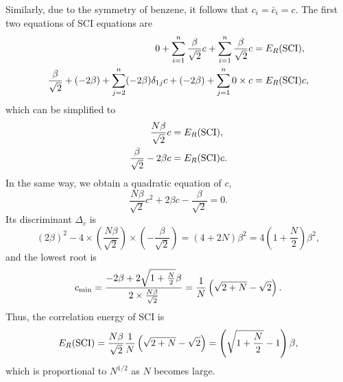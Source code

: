 \documentclass[a4paper]{book}
\newcounter{solution}[chapter]
\begin{document}
\begin{solution}
	Similarly, due to the symmetry of benzene, it follows that $c_i = \bar{c}_i = c$. The first two equations of SCI equations are
	\begin{align*}
		0 + \sum_{i=1}^n \frac{ \beta }{ \sqrt{2} } c + \sum_{i=1}^n \frac{ \beta }{ \sqrt{2} } c &= E_R({\rm SCI}) , \\
		\frac{ \beta }{ \sqrt{2} } + ( - 2 \beta ) + \sum_{ j=2 }^n ( -2 \beta ) \delta_{1j} c + ( - 2 \beta ) + \sum_{ j=1 }^n 0 \times c &= E_R({\rm SCI}) c,
	\end{align*}
	which can be simplified to
	\begin{align*}
		\frac{ N\beta }{ \sqrt{2} } c &= E_R({\rm SCI}) , \\
		\frac{ \beta }{ \sqrt{2} } - 2 \beta c &= E_R({\rm SCI}) c.
	\end{align*}
	In the same way, we obtain a quadratic equation of $c$,
	\[
		\frac{ N \beta }{ \sqrt{2} } c^2 + 2 \beta c - \frac{ \beta }{ \sqrt{2} } = 0.		
	\]
	Its discriminant $\Delta_c$ is
	\[
		( 2\beta )^2 - 4 \times ( \frac{ N \beta }{ \sqrt{2} } )  \times ( - \frac{ \beta }{ \sqrt{2} } ) = (4 + 2N)\beta^2 = 4( 1 + \frac{N}{2} ) \beta^2,
	\]	
	and the lowest root is
	\[
		c_{\rm min} = \frac{ - 2\beta + 2\sqrt{ 1 + \frac{N}{2} } \beta }{ 2 \times \frac{ N \beta }{ \sqrt{2} } } = \frac{1}{N} \left( \sqrt{ 2 + N } - \sqrt{2} \right) .
	\]
	Thus, the correlation energy of SCI is
	\[
		E_R({\rm SCI}) = \frac{ N\beta }{ \sqrt{2} } \frac{1}{N} \left( \sqrt{ 2 + N } - \sqrt{2} \right) = \left( \sqrt{ 1 + \frac{N}{2} } - 1 \right) \beta,
	\]
	which is proportional to $N^{1/2}$ as $N$ becomes large.
	
	\end{solution}
\end{document}
